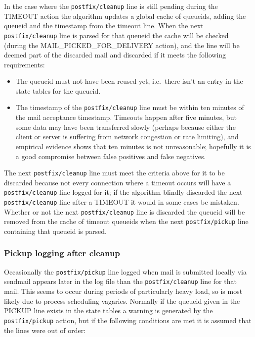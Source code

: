 \documentclass[a4paper,12pt,draft]{article}
\newcommand{\daemon}[1]{%
    \texttt{postfix/#1}%
}
\begin{document}
In the case where the \daemon{cleanup} line is still pending during the
TIMEOUT action the algorithm updates a global cache of queueids, adding the
queueid and the timestamp from the timeout line.  When the next
\daemon{cleanup} line is parsed for that queueid the cache will be checked
(during the MAIL\_PICKED\_FOR\_DELIVERY action),
and the line will be deemed part of the discarded mail and discarded if it
meets the following requirements:

\begin{itemize}

    \item The queueid must not have been reused yet, i.e.\ there isn't an
        entry in the state tables for the queueid.

    \item The timestamp of the \daemon{cleanup} line must be within ten
        minutes of the mail acceptance timestamp.  Timeouts happen after
        five minutes, but some data may have been transferred slowly
        (perhaps because either the client or server is suffering from
        network congestion or rate limiting), and empirical evidence shows
        that ten minutes is not unreasonable; hopefully it is a good
        compromise between false positives and false negatives.

\end{itemize}

The next \daemon{cleanup} line must meet the criteria above for it to be
discarded because not every connection where a timeout occurs will have a
\daemon{cleanup} line logged for it; if the algorithm blindly discarded the
next \daemon{cleanup} line after a TIMEOUT it would in some cases be
mistaken.  Whether or not the next \daemon{cleanup} line is discarded the
queueid will be removed from the cache of timeout queueids when the next
\daemon{pickup} line containing that queueid is parsed.

\subsubsection{Pickup logging after cleanup}

\label{pickup logging after cleanup}

Occasionally the \daemon{pickup} line logged when mail is submitted locally
via sendmail appears later in the log file than the \daemon{cleanup} line
for that mail.  This seems to occur during periods of particularly heavy
load, so is most likely due to process scheduling vagaries.  Normally if
the queueid given in the PICKUP line exists in the state tables a warning
is generated by the \daemon{pickup} action, but if the following conditions
are met it is assumed that the lines were out of order:
\end{document}
